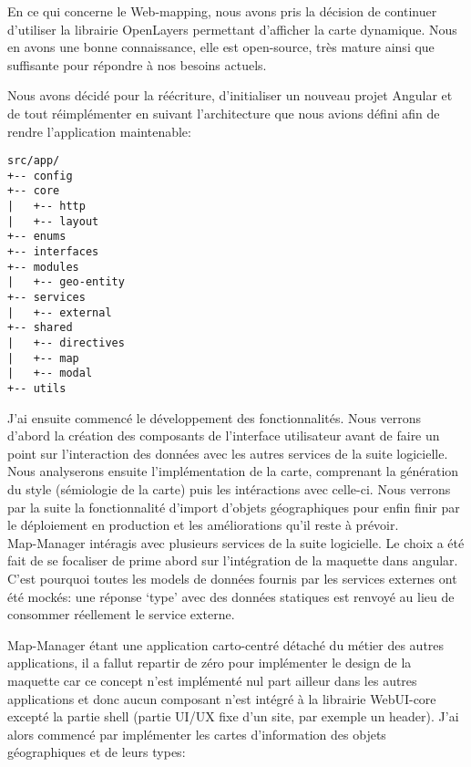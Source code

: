 \documentclass{rapportUHA40}
\begin{document}
En ce qui concerne le Web-mapping, nous avons pris la décision de continuer
d'utiliser la librairie OpenLayers permettant d'afficher la carte dynamique.
Nous en avons une bonne connaissance, elle est open-source, très mature ainsi
que suffisante pour répondre à nos besoins actuels.

Nous avons décidé pour la réécriture, d'initialiser un nouveau projet Angular
et de tout réimplémenter en suivant l'architecture que nous avions défini afin
de rendre l'application maintenable:

\begin{verbatim}
src/app/
+-- config
+-- core
|   +-- http
|   +-- layout
+-- enums
+-- interfaces
+-- modules
|   +-- geo-entity
+-- services
|   +-- external
+-- shared
|   +-- directives
|   +-- map
|   +-- modal
+-- utils
\end{verbatim}

J'ai ensuite commencé le développement des fonctionnalités. Nous verrons
d'abord la création des composants de l'interface utilisateur avant de faire un
point sur l'interaction des données avec les autres services de la suite
logicielle. Nous analyserons ensuite l'implémentation de la carte, comprenant
la génération du style (sémiologie de la carte) puis les intéractions avec
celle-ci. Nous verrons par la suite la fonctionnalité d'import d'objets
géographiques pour enfin finir par le déploiement en production et les
améliorations qu'il reste à prévoir.\\

Map-Manager intéragis avec plusieurs services de la suite logicielle. Le choix
a été fait de se focaliser de prime abord sur l'intégration de la maquette dans
angular. C'est pourquoi toutes les models de données fournis par les services
externes ont été mockés: une réponse `type' avec des données statiques est
renvoyé au lieu de consommer réellement le service externe.

Map-Manager étant une application carto-centré détaché du métier des autres
applications, il a fallut repartir de zéro pour implémenter le design de la
maquette car ce concept n'est implémenté nul part ailleur dans les autres
applications et donc aucun composant n'est intégré à la librairie WebUI-core
excepté la partie shell (partie UI/UX fixe d'un site, par exemple un header).
J'ai alors commencé par implémenter les cartes d'information des objets
géographiques et de leurs types: 
\end{document}
